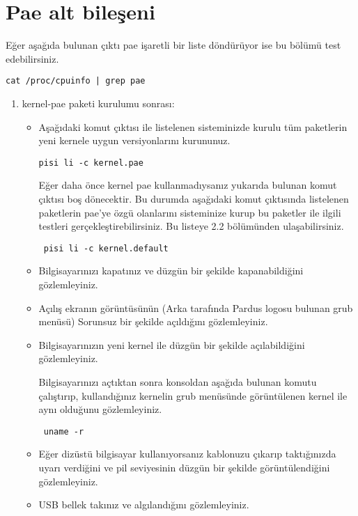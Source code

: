\documentclass[a4paper,10pt]{article}
\begin{document}
\section{Pae alt bileşeni}

Eğer aşağıda bulunan çıktı pae işaretli bir liste döndürüyor ise bu bölümü test edebilirsiniz.
\begin{verbatim}
cat /proc/cpuinfo | grep pae 
\end{verbatim}

\begin{enumerate}

 \item kernel-pae paketi kurulumu sonrası:

\begin{itemize}
\item
Aşağıdaki komut çıktısı ile listelenen sisteminizde kurulu tüm paketlerin yeni kernele uygun versiyonlarını kurununuz.
\begin{verbatim}
pisi li -c kernel.pae
\end{verbatim}

Eğer daha önce kernel pae kullanmadıysanız yukarıda bulunan komut çıktısı boş dönecektir. Bu durumda aşağıdaki komut çıktısında listelenen paketlerin pae'ye özgü olanlarını sisteminize kurup bu paketler ile ilgili testleri gerçekleştirebilirsiniz. Bu listeye 2.2 bölümünden ulaşabilirsiniz.

\begin{verbatim}
 pisi li -c kernel.default
\end{verbatim}


\item Bilgisayarınızı kapatınız ve düzgün bir şekilde kapanabildiğini gözlemleyiniz.
\item Açılış ekranın görüntüsünün (Arka tarafında Pardus logosu bulunan grub menüsü) Sorunsuz bir şekilde açıldığını gözlemleyiniz.
\item Bilgisayarınızın yeni kernel ile düzgün bir şekilde açılabildiğini gözlemleyiniz.

Bilgisayarınızı açtıktan sonra konsoldan aşağıda bulunan komutu çalıştırıp, kullandığınız kernelin grub menüsünde görüntülenen kernel ile aynı olduğunu gözlemleyiniz.
\begin{verbatim}
 uname -r 
\end{verbatim}

\item Eğer dizüstü bilgisayar kullanıyorsanız kablonuzu çıkarıp taktığınızda uyarı verdiğini ve pil seviyesinin düzgün bir şekilde görüntülendiğini gözlemleyiniz.
\item USB bellek takınız ve algılandığını gözlemleyiniz.
\end{itemize}


\end{enumerate}
\end{document}

